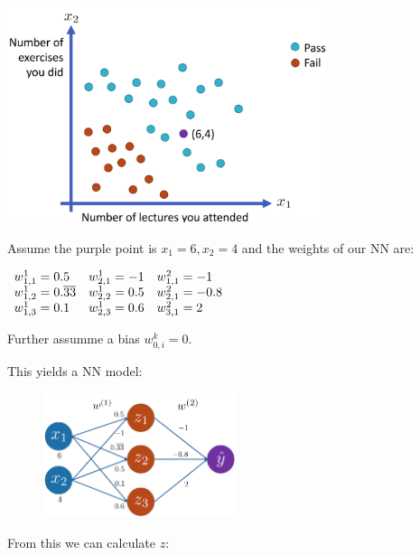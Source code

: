 \documentclass[
../../EiKI_Summary.tex,
]
{subfiles}
\begin{document}
\begin{minipage}
    [t]{0.5\textwidth}
    \centering
    \includegraphics[valign=T,width=0.7\textwidth]{Pics/11/PredictionExample.png}
\end{minipage}
\begin{minipage}
    [t]{0.5\textwidth}
    Assume the purple point is $x_1 = 6, x_2 = 4$ and the weights of our NN are:

    \begin{csmb*}
        $\begin{array}{l l l}
            w_{1,1}^1 = 0.5 & w_{2,1}^1 = -1 & w_{1,1}^2 = -1 \\
            w_{1,2}^1 = 0.\overline{33} & w_{2,2}^1 = 0.5 & w_{2,1}^2 = -0.8 \\
            w_{1,3}^1 = 0.1 & w_{2,3}^1 = 0.6 & w_{3,1}^2 = 2 \\
        \end{array}$
    \end{csmb*}

    Further assumme a bias $w_{0,i}^k = 0$.
\end{minipage}

This yields a NN model:

\begin{figure}[H]
    \centering
    \includegraphics[width=0.5\textwidth]{Pics/11/PredictionNN.png}
\end{figure}

From this we can calculate $z$:
\end{document}
